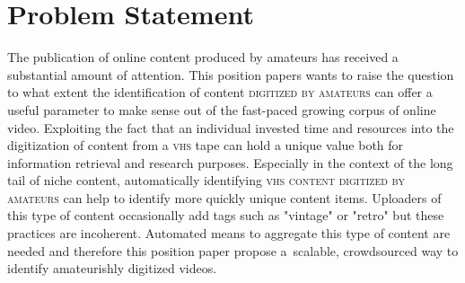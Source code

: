 \documentclass[runningheads,a4paper]{llncs}
\begin{document}
\section{Problem Statement}
The publication of online content produced by amateurs has received a substantial amount 
of attention. This position papers wants to raise the question to what extent 
the identification of content {\scshape digitized by amateurs} can offer a useful parameter 
to make sense out of the fast-paced growing corpus of online video. 
Exploiting the fact that an individual invested time and resources into the 
digitization of content from a {\scshape vhs} tape can hold a unique value 
both for information retrieval and research purposes. 
Especially in the context of the long tail of niche content,
automatically identifying {\scshape vhs content digitized by amateurs}     
can help to identify more quickly unique content items.
Uploaders of this type of content occasionally add tags 
such as "vintage" or "retro" but these practices are incoherent. 
Automated means to aggregate this type of content are needed 
and therefore this position paper propose a~scalable, crowdsourced way
to identify amateurishly digitized videos.

\vspace{-1em}
\end{document}
